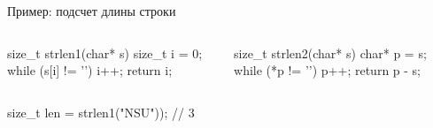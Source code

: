 \begin{frame}[fragile]{Пример: подсчет длины строки}

  \begin{columns}[onlytextwidth,T]
    \begin{column}{0.45\textwidth}
      \begin{clisting}
        size_t strlen1(char* s) {
          size_t i = 0;
          while (s[i] != '\0') {
            i++;
          }
          return i;
        }
      \end{clisting}

    \end{column}
    \begin{column}{0.45\textwidth}
      \begin{clisting}
        size_t strlen2(char* s) {
          char* p = s;
          while (*p != '\0') {
            p++;
          }
          return p - s;
        }
      \end{clisting}

    \end{column}
  \end{columns}

  \vspace{1em}

  \begin{clisting}
    size_t len = strlen1("NSU")); // 3
  \end{clisting}

\end{frame}


